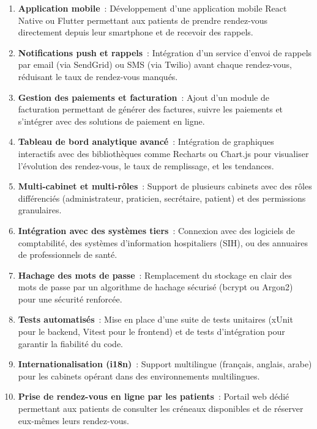 \begin{enumerate}
    \item \textbf{Application mobile}~: Développement d'une application mobile React Native ou Flutter permettant aux patients de prendre rendez-vous directement depuis leur smartphone et de recevoir des rappels.

    \item \textbf{Notifications push et rappels}~: Intégration d'un service d'envoi de rappels par email (via SendGrid) ou SMS (via Twilio) avant chaque rendez-vous, réduisant le taux de rendez-vous manqués.

    \item \textbf{Gestion des paiements et facturation}~: Ajout d'un module de facturation permettant de générer des factures, suivre les paiements et s'intégrer avec des solutions de paiement en ligne.

    \item \textbf{Tableau de bord analytique avancé}~: Intégration de graphiques interactifs avec des bibliothèques comme Recharts ou Chart.js pour visualiser l'évolution des rendez-vous, le taux de remplissage, et les tendances.

    \item \textbf{Multi-cabinet et multi-rôles}~: Support de plusieurs cabinets avec des rôles différenciés (administrateur, praticien, secrétaire, patient) et des permissions granulaires.

    \item \textbf{Intégration avec des systèmes tiers}~: Connexion avec des logiciels de comptabilité, des systèmes d'information hospitaliers (SIH), ou des annuaires de professionnels de santé.

    \item \textbf{Hachage des mots de passe}~: Remplacement du stockage en clair des mots de passe par un algorithme de hachage sécurisé (bcrypt ou Argon2) pour une sécurité renforcée.

    \item \textbf{Tests automatisés}~: Mise en place d'une suite de tests unitaires (xUnit pour le backend, Vitest pour le frontend) et de tests d'intégration pour garantir la fiabilité du code.

    \item \textbf{Internationalisation (i18n)}~: Support multilingue (français, anglais, arabe) pour les cabinets opérant dans des environnements multilingues.

    \item \textbf{Prise de rendez-vous en ligne par les patients}~: Portail web dédié permettant aux patients de consulter les créneaux disponibles et de réserver eux-mêmes leurs rendez-vous.
\end{enumerate}

\clearpage

